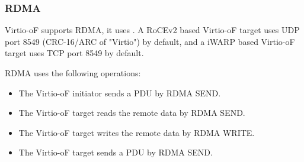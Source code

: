 \subsubsection{RDMA}\label{sec:Virtio Transport Options / Virtio Over Fabrics / Transport Binding / RDMA}
Virtio-oF supports RDMA, it uses
.
A RoCEv2 based Virtio-oF target uses UDP port 8549 (CRC-16/ARC of "Virtio") by default, and a iWARP based Virtio-oF target uses TCP port 8549 by default.

RDMA uses the following operations:
\begin{itemize}
\item The Virtio-oF initiator sends a PDU by RDMA SEND.
\item The Virtio-oF target reads the remote data by RDMA SEND.
\item The Virtio-oF target writes the remote data by RDMA WRITE.
\item The Virtio-oF target sends a PDU by RDMA SEND.
\end{itemize}


